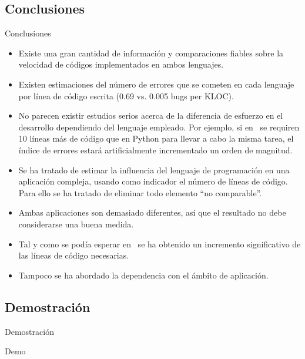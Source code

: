 \subsection{Conclusiones}
\begin{frame}{Conclusiones}
\begin{itemize}
	\item Existe una gran cantidad de información y comparaciones fiables sobre la
	velocidad de códigos implementados en ambos lenguajes. \pause
	\item Existen estimaciones del número de errores que se cometen en cada
	lenguaje por línea de código escrita (0.69 vs. 0.005 bugs per KLOC). \pause
	\item No parecen existir estudios serios acerca de la diferencia de esfuerzo
	en el desarrollo dependiendo del lenguaje empleado.
	Por ejemplo, si en \CC $\,$ se requiren 10 líneas más de código que en Python
	para llevar a cabo la misma tarea, el índice de errores estará artificialmente
	incrementado un orden de magnitud. \pause
	\item Se ha tratado de estimar la influencia del lenguaje de programación
	en una aplicación compleja, usando como indicador el número de líneas
	de código. Para ello se ha tratado de eliminar todo elemento ``no comparable''.
	\pause
	\item Ambas aplicaciones son demasiado diferentes, así que el resultado no
	debe considerarse una buena medida. \pause
	\item Tal y como se podía esperar en \CC $\,$ se ha obtenido un incremento
	significativo de las líneas de código necesarias. \pause
	\item Tampoco se ha abordado la dependencia con el ámbito de aplicación.
\end{itemize}
\end{frame}

\subsection{Demostración}
\begin{frame}{Demostración}
\begin{center}
{\Huge Demo}
\end{center}
\end{frame}
